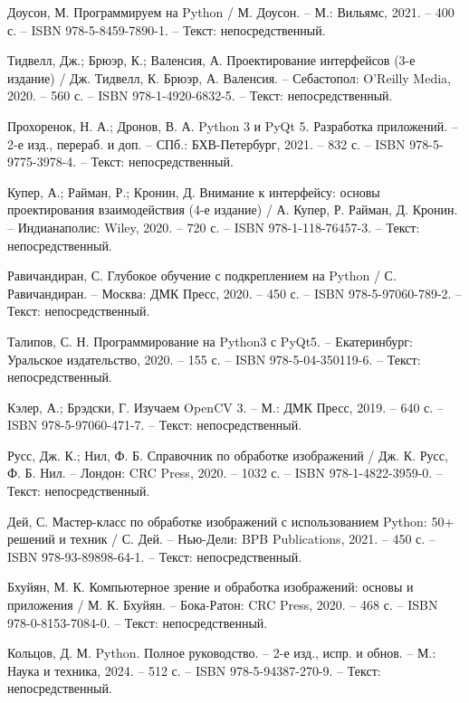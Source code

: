 \begin{thebibliography}{9}
    Доусон, М. Программируем на Python / М. Доусон. – М.: Вильямс, 2021. – 400 с. – ISBN 978-5-8459-7890-1. – Текст: непосредственный.
    
    Тидвелл, Дж.; Брюэр, К.; Валенсия, А. Проектирование интерфейсов (3-е издание) / Дж. Тидвелл, К. Брюэр, А. Валенсия. – Себастопол: O’Reilly Media, 2020. – 560 с. – ISBN 978-1-4920-6832-5. – Текст: непосредственный.
    
    Прохоренок, Н. А.; Дронов, В. А. Python 3 и PyQt 5. Разработка приложений. – 2-е изд., перераб. и доп. – СПб.: БХВ-Петербург, 2021. – 832 с. – ISBN 978-5-9775-3978-4. – Текст: непосредственный.
    
    Купер, А.; Райман, Р.; Кронин, Д. Внимание к интерфейсу: основы проектирования взаимодействия (4-е издание) / А. Купер, Р. Райман, Д. Кронин. – Индианаполис: Wiley, 2020. – 720 с. – ISBN 978-1-118-76457-3. – Текст: непосредственный.
    
    Равичандиран, С. Глубокое обучение с подкреплением на Python / С. Равичандиран. – Москва: ДМК Пресс, 2020. – 450 с. – ISBN 978-5-97060-789-2. – Текст: непосредственный.
    
    Талипов, С. Н. Программирование на Python3 с PyQt5. – Екатеринбург: Уральское издательство, 2020. – 155 с. – ISBN 978-5-04-350119-6. – Текст: непосредственный.
    
    Кэлер, А.; Брэдски, Г. Изучаем OpenCV 3. – М.: ДМК Пресс, 2019. – 640 с. – ISBN 978-5-97060-471-7. – Текст: непосредственный.
    
    Русс, Дж. К.; Нил, Ф. Б. Справочник по обработке изображений / Дж. К. Русс, Ф. Б. Нил. – Лондон: CRC Press, 2020. – 1032 с. – ISBN 978-1-4822-3959-0. – Текст: непосредственный.
    
    Дей, С. Мастер-класс по обработке изображений с использованием Python: 50+ решений и техник / С. Дей. – Нью-Дели: BPB Publications, 2021. – 450 с. – ISBN 978-93-89898-64-1. – Текст: непосредственный.
    
    Бхуйян, М. К. Компьютерное зрение и обработка изображений: основы и приложения / М. К. Бхуйян. – Бока-Ратон: CRC Press, 2020. – 468 с. – ISBN 978-0-8153-7084-0. – Текст: непосредственный.
    
    Кольцов, Д. М. Python. Полное руководство. – 2-е изд., испр. и обнов. – М.: Наука и техника, 2024. – 512 с. – ISBN 978-5-94387-270-9. – Текст: непосредственный.


\end{thebibliography}
